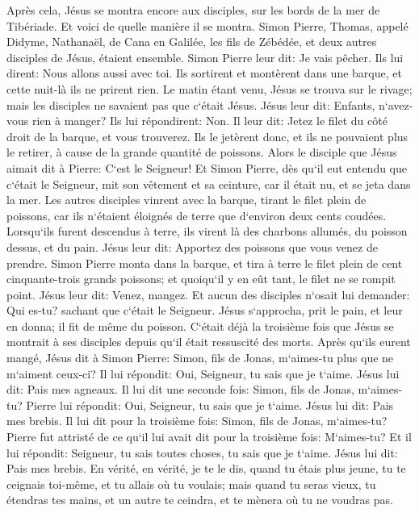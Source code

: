 \verse Après cela, Jésus se montra encore aux disciples, sur les bords de la mer de Tibériade. Et voici de quelle manière il se montra. 
\verse Simon Pierre, Thomas, appelé Didyme, Nathanaël, de Cana en Galilée, les fils de Zébédée, et deux autres disciples de Jésus, étaient ensemble. 
\verse Simon Pierre leur dit: Je vais pêcher. Ils lui dirent: Nous allons aussi avec toi. Ils sortirent et montèrent dans une barque, et cette nuit-là ils ne prirent rien. 
\verse Le matin étant venu, Jésus se trouva sur le rivage; mais les disciples ne savaient pas que c`était Jésus. 
\verse Jésus leur dit: Enfants, n`avez-vous rien à manger? Ils lui répondirent: Non. 
\verse Il leur dit: Jetez le filet du côté droit de la barque, et vous trouverez. Ils le jetèrent donc, et ils ne pouvaient plus le retirer, à cause de la grande quantité de poissons. 
\verse Alors le disciple que Jésus aimait dit à Pierre: C`est le Seigneur! Et Simon Pierre, dès qu`il eut entendu que c`était le Seigneur, mit son vêtement et sa ceinture, car il était nu, et se jeta dans la mer. 
\verse Les autres disciples vinrent avec la barque, tirant le filet plein de poissons, car ils n`étaient éloignés de terre que d`environ deux cents coudées. 
\verse Lorsqu`ils furent descendus à terre, ils virent là des charbons allumés, du poisson dessus, et du pain. 
\verse Jésus leur dit: Apportez des poissons que vous venez de prendre. 
\verse Simon Pierre monta dans la barque, et tira à terre le filet plein de cent cinquante-trois grands poissons; et quoiqu`il y en eût tant, le filet ne se rompit point. 
\verse Jésus leur dit: Venez, mangez. Et aucun des disciples n`osait lui demander: Qui es-tu? sachant que c`était le Seigneur. 
\verse Jésus s`approcha, prit le pain, et leur en donna; il fit de même du poisson. 
\verse C`était déjà la troisième fois que Jésus se montrait à ses disciples depuis qu`il était ressuscité des morts. 
\verse Après qu`ils eurent mangé, Jésus dit à Simon Pierre: Simon, fils de Jonas, m`aimes-tu plus que ne m`aiment ceux-ci? Il lui répondit: Oui, Seigneur, tu sais que je t`aime. Jésus lui dit: Pais mes agneaux. 
\verse Il lui dit une seconde fois: Simon, fils de Jonas, m`aimes-tu? Pierre lui répondit: Oui, Seigneur, tu sais que je t`aime. Jésus lui dit: Pais mes brebis. 
\verse Il lui dit pour la troisième fois: Simon, fils de Jonas, m`aimes-tu? Pierre fut attristé de ce qu`il lui avait dit pour la troisième fois: M`aimes-tu? Et il lui répondit: Seigneur, tu sais toutes choses, tu sais que je t`aime. Jésus lui dit: Pais mes brebis. 
\verse En vérité, en vérité, je te le dis, quand tu étais plus jeune, tu te ceignais toi-même, et tu allais où tu voulais; mais quand tu seras vieux, tu étendras tes mains, et un autre te ceindra, et te mènera où tu ne voudras pas. 
